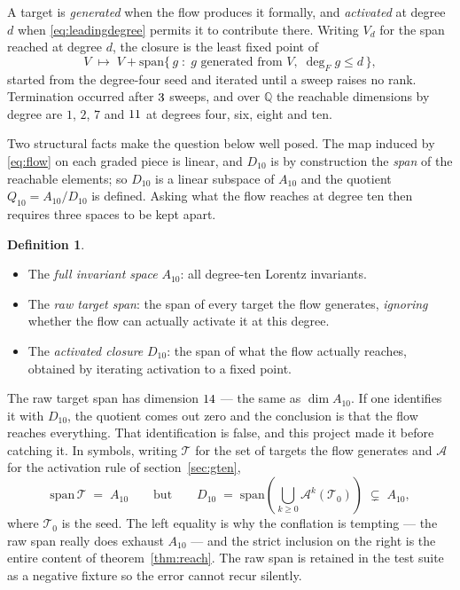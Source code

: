 \documentclass[11pt,a4paper]{article}
\theoremstyle{definition}
\newtheorem{definition}[theorem]{Definition}
\theoremstyle{remark}
\newcommand{\Ften}{A_{10}}
\newcommand{\Dten}{D_{10}}
\newcommand{\Qten}{Q_{10}}
\newcommand{\Q}{\mathbb{Q}}
\begin{document}
A target is \emph{generated} when the flow produces it formally, and
\emph{activated} at degree $d$ when \eqref{eq:leadingdegree} permits it to
contribute there. Writing $V_d$ for the span reached at degree $d$, the closure
is the least fixed point of
\begin{equation}
V \;\longmapsto\;
 V + \mathrm{span}\bigl\{\,g \;:\; g \text{ generated from } V,\;
 \deg_F g \le d \,\bigr\},
\label{eq:closureoperator}
\end{equation}
started from the degree-four seed and iterated until a sweep raises no rank.
Termination occurred after $3$ sweeps, and over $\Q$ the reachable
dimensions by degree are $1$, $2$, $7$ and $11$ at degrees four, six,
eight and ten.

Two structural facts make the question below well posed. The map induced by
\eqref{eq:flow} on each graded piece is linear, and $\Dten$ is by construction
the \emph{span} of the reachable elements; so $\Dten$ is a linear subspace of
$\Ften$ and the quotient $\Qten = \Ften/\Dten$ is defined. Asking what the flow
reaches at degree ten then requires three spaces to be kept apart.

\begin{definition}\leavevmode
\begin{itemize}\itemsep2pt
\item The \emph{full invariant space} $\Ften$: all degree-ten Lorentz invariants.
\item The \emph{raw target span}: the span of every target the flow generates,
      \emph{ignoring} whether the flow can actually activate it at this degree.
\item The \emph{activated closure} $\Dten$: the span of what the flow actually
      reaches, obtained by iterating activation to a fixed point.
\end{itemize}
\end{definition}

The raw target span has dimension $14$ --- the same as $\dim \Ften$. If one
identifies it with $\Dten$, the quotient comes out zero and the conclusion is
that the flow reaches everything. That identification is false, and this project
made it before catching it. In symbols, writing $\mathcal{T}$ for the set of targets the flow generates and
$\mathcal{A}$ for the activation rule of section~\ref{sec:gten},
\begin{equation}
\mathrm{span}\,\mathcal{T} \;=\; \Ften
\qquad\text{but}\qquad
\Dten \;=\; \mathrm{span}\!\left(\bigcup_{k\ge 0}\mathcal{A}^{k}(\mathcal{T}_0)\right)
 \;\subsetneq\; \Ften,
\label{eq:rawvsactivated}
\end{equation}
where $\mathcal{T}_0$ is the seed. The left equality is why the conflation is
tempting --- the raw span really does exhaust $\Ften$ --- and the strict
inclusion on the right is the entire content of theorem~\ref{thm:reach}. The raw
span is retained in the test suite as a negative fixture so the error cannot
recur silently.
\end{document}
